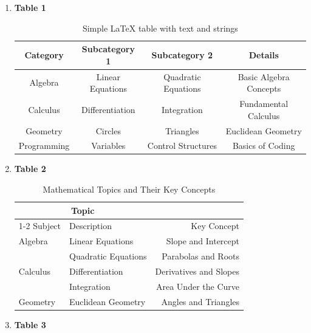 \documentclass{article}
\begin{document}
\begin{enumerate}
    \item \textbf{Table 1}
\begin{table}[h]
\centering
\begin{tabular}{|c|c|c|c|}
\hline
\textbf{Category} & \textbf{Subcategory 1} & \textbf{Subcategory 2} & \textbf{Details} \\ \hline
Algebra & Linear Equations & Quadratic Equations & Basic Algebra Concepts \\ \hline
Calculus & Differentiation & Integration & Fundamental Calculus \\ \hline
Geometry & Circles & Triangles & Euclidean Geometry \\ \hline
Programming & Variables & Control Structures & Basics of Coding \\ \hline
\end{tabular}
\caption{Simple LaTeX table with text and strings}
\label{tab:table1}
\end{table}

\item \textbf{Table 2}

\begin{table}[h]
\centering
\begin{tabular}{llr}
\toprule
\multicolumn{2}{c}{Topic} \\ 
\cmidrule(lr){1-2}
Subject & Description & Key Concept \\
\midrule
Algebra   & Linear Equations     & Slope and Intercept \\
          & Quadratic Equations  & Parabolas and Roots \\
Calculus  & Differentiation      & Derivatives and Slopes \\
          & Integration          & Area Under the Curve \\
Geometry  & Euclidean Geometry   & Angles and Triangles \\
\bottomrule
\end{tabular}
\caption{Mathematical Topics and Their Key Concepts}
\label{tab:table2}
\end{table}

\item \textbf{Table 3}


\end{enumerate}
\end{document}
